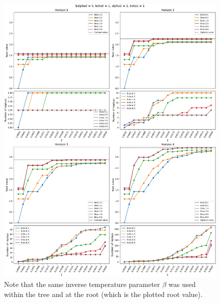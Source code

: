 \documentclass{article}
\begin{document}
\begin{figure}[ht!]
    \centering
    \includegraphics[width=1\textwidth]{../../../../bandit/data/convergence/xi/alpha05_beta01_alpha11_beta11_complete.png}
    \caption{Note that the same inverse temperature parameter $\beta$ was used within the tree and at the 
    root (which is the plotted root value).}
\end{figure}
\end{document}
